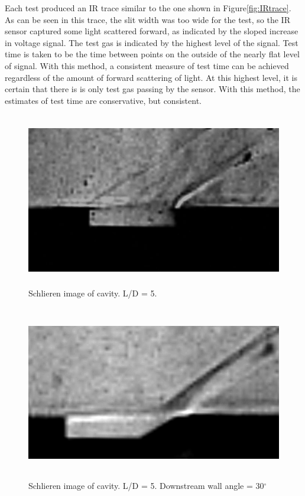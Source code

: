 Each test produced an IR trace similar to the one shown in Figure\ref{fig:IRtrace}. As can be seen in this trace, the slit width was too wide for the test, so the IR sensor captured some light scattered forward, as indicated by the sloped increase in voltage signal. The test gas is indicated by the highest level of the signal. Test time is taken to be the time between points on the outside of the nearly flat level of signal. With this method, a consistent measure of test time can be achieved regardless of the amount of forward scattering of light. At this highest level, it is certain that there is is only test gas passing by the sensor. With this method, the estimates of test time are conservative, but consistent.


\newpage

\begin{figure}
\centering
\includegraphics[height = 3in]{Figures/5.jpg}
\caption[Schlieren image of cavity. L/D = 5.]{Schlieren image of cavity. L/D = 5.}
\label{fig:5}
\end{figure}

\begin{figure}
\centering
\includegraphics[height = 3in]{Figures/5-30.jpg}
\caption[Schlieren image of cavity with angled downstream wall. L/D = 5.]{Schlieren image of cavity. L/D = 5. Downstream wall angle = 30$^\circ$}
\label{fig:5-30}
\end{figure}


